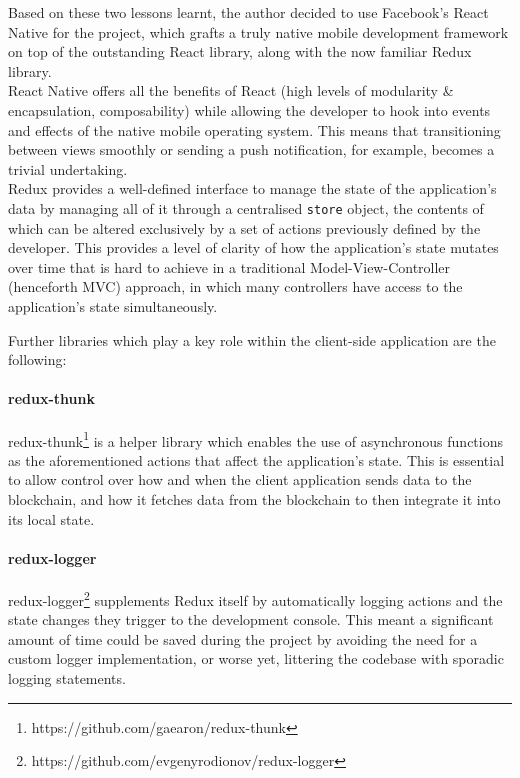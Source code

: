 \documentclass[12pt]{report}
\let\oldparagraph\paragraph
\renewcommand{\paragraph}[1]{\oldparagraph{#1}\mbox{}}
\begin{document}
Based on these two lessons learnt, the author decided to use Facebook's
React Native\cite{2react-native} for the project, which grafts a truly native mobile development
framework on top of the outstanding React library, along with the now
familiar Redux library.\\
React Native offers all the benefits of React (high levels of modularity
\& encapsulation, composability) while allowing the developer to hook
into events and effects of the native mobile operating system. This
means that transitioning between views smoothly or sending a push
notification, for example, becomes a trivial undertaking.\\
Redux provides a well-defined interface to manage the state of the
application's data by managing all of it through a centralised
\texttt{store} object, the contents of which can be altered exclusively
by a set of actions previously defined by the developer. This provides a
level of clarity of how the application's state mutates over time that
is hard to achieve in a traditional Model-View-Controller\cite{krasner1988description}
(henceforth MVC) approach, in which many controllers have access to the
application's state simultaneously.

Further libraries which play a key role within the client-side
application are the following:

\paragraph{redux-thunk}\label{redux-thunk}

redux-thunk\footnote{https://github.com/gaearon/redux-thunk}
is a helper library which enables the use of asynchronous functions as
the aforementioned actions that affect the application's state. This is
essential to allow control over how and when the client application
sends data to the blockchain, and how it fetches data from the
blockchain to then integrate it into its local state.

\paragraph{redux-logger}\label{redux-logger}

redux-logger\footnote{https://github.com/evgenyrodionov/redux-logger}
supplements Redux itself by automatically logging actions and the state
changes they trigger to the development console. This meant a
significant amount of time could be saved during the project by avoiding
the need for a custom logger implementation, or worse yet, littering the
codebase with sporadic logging statements.
\end{document}
